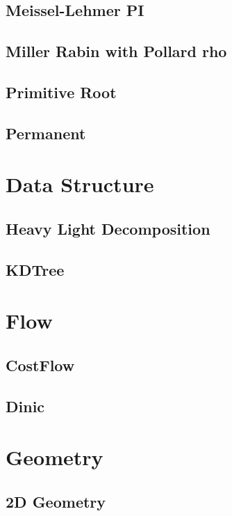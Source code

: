 \subsection{Meissel-Lehmer PI}

\subsection{Miller Rabin with Pollard rho}

\subsection{Primitive Root}

\subsection{Permanent}

\section{Data Structure}
\subsection{Heavy Light Decomposition}

\subsection{KDTree}


\section{Flow}
\subsection{CostFlow}

\subsection{Dinic}


\section{Geometry}
\subsection{2D Geometry}

